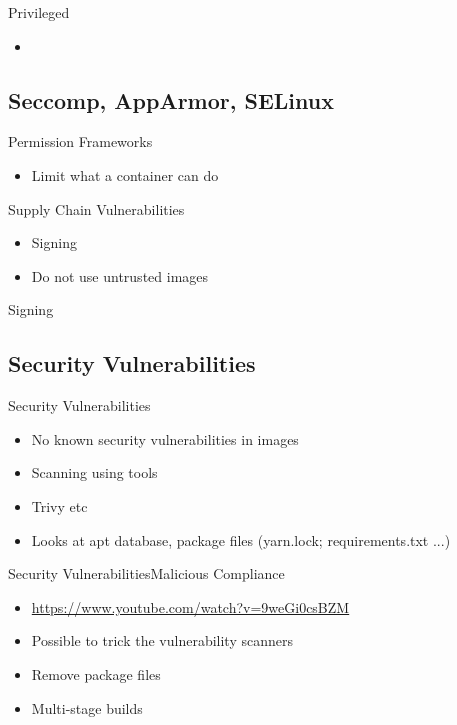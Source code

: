 \documentclass{dcpresentation}
\begin{document}
\begin{frame}{Privileged}
 \begin{itemize}
  \item 
 \end{itemize}
\end{frame}

\subsection{Seccomp, AppArmor, SELinux}

\begin{frame}{Permission Frameworks}
 \begin{itemize}
  \item Limit what a container can do
 \end{itemize}
\end{frame}

\begin{frame}{Supply Chain Vulnerabilities}
 \begin{itemize}
  \item Signing
  \item Do not use untrusted images
 \end{itemize}
Signing

\end{frame}

\subsection{Security Vulnerabilities}

\begin{frame}{Security Vulnerabilities}
 \begin{itemize}
  \item No known security vulnerabilities in images
  \item Scanning using tools
  \item Trivy etc
  \item Looks at apt database, package files (yarn.lock; requirements.txt ...)
 \end{itemize}  
\end{frame}

\begin{frame}{Security Vulnerabilities}{Malicious Compliance}
 \begin{itemize}
  \item \url{https://www.youtube.com/watch?v=9weGi0csBZM}
  \item Possible to trick the vulnerability scanners
  \item Remove package files
  \item Multi-stage builds
 \end{itemize}  
\end{frame}
\end{document}

